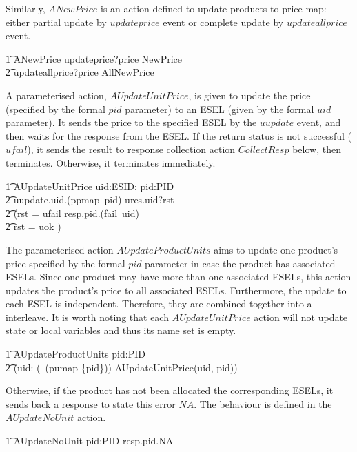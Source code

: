 Similarly, $ANewPrice$ is an action defined to update products to price map: either partial update by $updateprice$ event or complete update by $updateallprice$ event.
\begin{circusaction}
        \t1 ANewPrice \circdef updateprice?price \then \lschexpract NewPrice \rschexpract \\
            \t2 \extchoice updateallprice?price \then \lschexpract AllNewPrice \rschexpract \\
\end{circusaction}
A parameterised action, $AUpdateUnitPrice$, is given to update the price (specified by the formal $pid$ parameter) to an ESEL (given by the formal $uid$ parameter). It sends the price to the specified ESEL by the $uupdate$ event, and then waits for the response from the ESEL. If the return status is not successful ($ufail$), it sends the result to response collection action $CollectResp$ below, then terminates. Otherwise, it terminates immediately.
\begin{circusaction}
        \t1 AUpdateUnitPrice \circdef uid:ESID; pid:PID \circspot \\
            \t2 uupdate.uid.(ppmap~pid) \then ures.uid?rst \then \\
            \t2 (\lcircguard rst = ufail \rcircguard \circguard resp.pid.(fail~uid) \then \Skip \\
            \t2 \extchoice \lcircguard rst = uok \rcircguard \circguard \Skip)\\
\end{circusaction}
The parameterised action $AUpdateProductUnits$ aims to update one product's price specified by the formal $pid$ parameter in case the product has associated ESELs. Since one product may have more than one associated ESELs, this action updates the product's price to all associated ESELs. Furthermore, the update to each ESEL is independent. Therefore, they are combined together into a interleave. It is worth noting that each $AUpdateUnitPrice$ action will not update state or local variables and thus its name set is empty. 
\begin{circusaction}
        \t1 AUpdateProductUnits \circdef pid:PID \circspot \\
            \t2 (\Interleave uid: (\dom~(pumap \rres \{pid\})) \linter \emptyset \rinter \circspot AUpdateUnitPrice(uid, pid)) \\
\end{circusaction}
Otherwise, if the product has not been allocated the corresponding ESELs, it sends back a response to state this error $NA$. The behaviour is defined in the $AUpdateNoUnit$ action. 
\begin{circusaction}
        \t1 AUpdateNoUnit \circdef  pid:PID \circspot resp.pid.NA \then \Skip \\ 
\end{circusaction}

